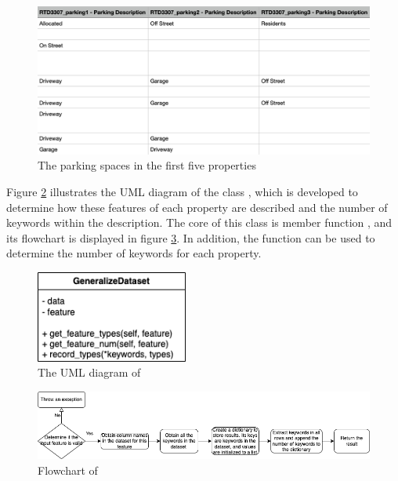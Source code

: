 \documentclass[12pt,twoside]{report}
\begin{document}
\begin{figure}[!htbp]
	\centering
	\includegraphics[width=12cm]{parking_dataset}
	\caption{The parking spaces in the first five properties}
	\label{parking_dataset}
\end{figure}

Figure \ref{uml_generalize_dataset} illustrates the UML diagram of the class , which is developed to determine how these features of each property are described and the number of keywords within the description. The core of this class is member function , and its flowchart is displayed in figure \ref{generalize_dataset_get_feature_types}. In addition, the function  can be used to determine the number of keywords for each property. 
\\

\begin{figure}[!htbp]
	\centering
	\includegraphics[width=5cm]{uml_generalize_dataset}
	\caption{The UML diagram of }
	\label{uml_generalize_dataset}
\end{figure}

\begin{figure}[!htbp]
	\centering
	\includegraphics[width=1\linewidth]{generalize_dataset_get_feature_types}
	\caption{Flowchart of }
	\label{generalize_dataset_get_feature_types}
\end{figure}
\end{document}
